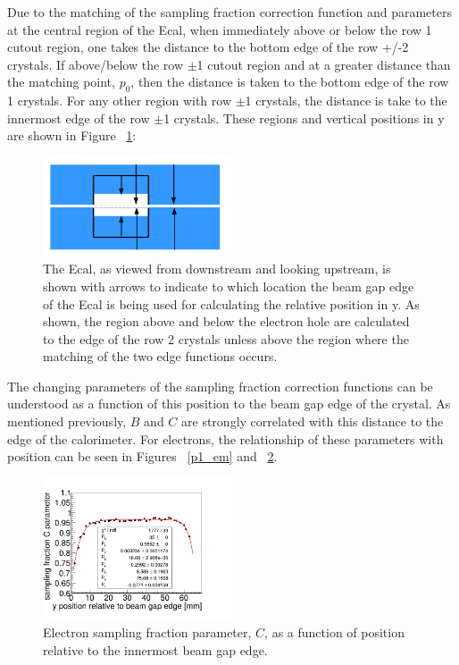\documentclass[twoside]{article}
\begin{document}
\begin{multicols}{2}
 Due to the matching of the sampling fraction correction function and parameters at the central region of the Ecal, when immediately above or below the row 1 cutout region, one takes the distance to the bottom edge of the row +/-2 crystals. If above/below the row $\pm$1 cutout region and at a greater distance than the matching point, $p_0$, then the distance is taken to the bottom edge of the row 1 crystals. For any other region with row $\pm$1 crystals, the distance is take to the innermost edge of the row $\pm$1 crystals. These regions and vertical positions in y are shown in Figure ~\ref{ecalY}:

\begin{figure}[H]
  \centering
      \includegraphics[width=0.5\textwidth]{pics/ecaldistance.png}
  \caption{The Ecal, as viewed from downstream and looking upstream, is shown with arrows to indicate to which location the beam gap edge of the Ecal is being used for calculating the relative position in y. As shown, the region above and below the electron hole are calculated to the edge of the row 2 crystals unless above the region where the matching of the two edge functions occurs.}
  \label{ecalY}
\end{figure}  
\indent The changing parameters of the sampling fraction correction functions can be understood as a function of this position to the beam gap edge of the crystal. As mentioned previously, $B$ and $C$ are strongly correlated with this distance to the edge of the calorimeter. For electrons, the relationship of these parameters with position can be seen in Figures ~\ref{p1_em} and ~\ref{p2_em}.

\begin{figure}[H]
  \centering
      \includegraphics[width=0.5\textwidth]{pics/par1_em.png}
  \caption{Electron sampling fraction parameter, $C$, as a function of position relative to the innermost beam gap edge.}
  \label{p2_em}
\end{figure} 


\end{multicols}
\end{document}
